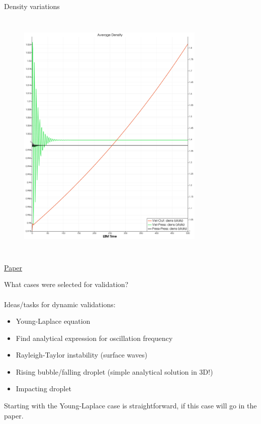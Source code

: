 \documentclass{beamer}
\begin{document}
\begin{frame}{Density variations}
\begin{columns}
\begin{figure}
				\includegraphics[width=0.8\textwidth]{pics/globalDenBox.png}
				\label{}
			\end{figure}
		\end{columns}
	\end{frame}
	
	\begin{frame}{\href{https://www.overleaf.com/project/5f5cfacb13ed640001eeb63d}{\color{green}Paper}}
		
		What cases were selected for validation?\\~\\
		
		Ideas/tasks for dynamic validations:
		\begin{itemize}
			\item Young-Laplace equation
			\item Find analytical expression for oscillation frequency
			\item Rayleigh-Taylor instability (surface waves)
			\item Rising bubble/falling droplet (simple analytical solution in 3D!)
			\item Impacting droplet
		\end{itemize}
	
	Starting with the Young-Laplace case is straightforward, if this case will go in the paper.
	\end{frame}
	
\end{document}
